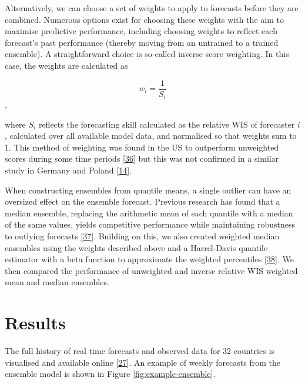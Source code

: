 \documentclass[
]{article}
\begin{document}
Alternatively, we can choose a set of weights to apply to forecasts before they are combined. Numerous options exist for choosing these weights with the aim to maximise predictive performance, including choosing weights to reflect each forecast's past performance (thereby moving from an untrained to a trained ensemble). A straightforward choice is so-called inverse score weighting. In this case, the weights are calculated as

\[w_i = \frac{1}{S_i}\] ,

where \(S_i\) reflects the forecasting skill calculated as the relative WIS of forecaster \(i\), calculated over all available model data, and normalised so that weights sum to 1. This method of weighting was found in the US to outperform unweighted scores during some time periods \protect\hyperlink{ref-taylorCombiningProbabilisticForecasts2021}{{[}36{]}} but this was not confirmed in a similar study in Germany and Poland \protect\hyperlink{ref-bracherPreregisteredShorttermForecasting2021}{{[}14{]}}.

When constructing ensembles from quantile means, a single outlier can have an oversized effect on the ensemble forecast. Previous research has found that a median ensemble, replacing the arithmetic mean of each quantile with a median of the same values, yields competitive performance while maintaining robustness to outlying forecasts \protect\hyperlink{ref-rayComparingTrainedUntrained2022}{{[}37{]}}. Building on this, we also created weighted median ensembles using the weights described above and a Harrel-Davis quantile estimator with a beta function to approximate the weighted percentiles \protect\hyperlink{ref-harrellNewDistributionfreeQuantile1982}{{[}38{]}}. We then compared the performance of unweighted and inverse relative WIS weighted mean and median ensembles.

\hypertarget{results}{%
\section{Results}\label{results}}

The full history of real time forecasts and observed data for 32 countries is visualised and available online \protect\hyperlink{ref-europeancovid-19forecasthubEuropeanCovid19Forecast}{{[}27{]}}. An example of weekly forecasts from the ensemble model is shown in Figure \ref{fig:example-ensemble}.
\end{document}
